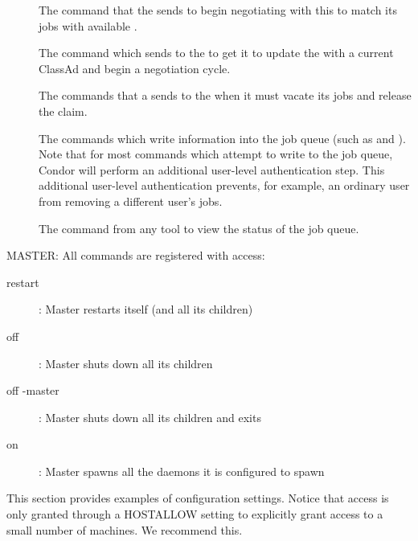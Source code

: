 \begin{description}
\item[]
The command that the  sends to
  begin negotiating with this  to match its jobs with available
  .

\item[]
The command which  sends to
  the  to get it to update the  with a current ClassAd
  and begin a negotiation cycle.

  The commands that a  sends to the  when it must vacate
  its jobs and release the  claim.

  The commands which write information into the job queue (such as
   and ).  
  Note that for most commands which attempt to write to the job queue, Condor
  will perform an additional user-level authentication step.  
  This additional user-level authentication prevents, for example, an
  ordinary user from removing a different user's jobs.

\item[]
The command from any
  tool to view the status of the job queue.  
\end{description}

MASTER:  All commands are registered with 
access:

\begin{description}
\item[restart] : Master restarts itself (and all its children)	
\item[off] : Master shuts down all its children
\item[off -master] : Master shuts down all its children and exits
\item[on] : Master spawns all the daemons it is configured to spawn
\end{description}


This section provides examples of configuration settings.
Notice that  access is
only granted through a HOSTALLOW setting to explicitly grant access to
a small number of machines.  We recommend this.

